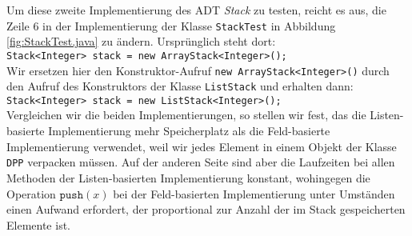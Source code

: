 Um diese zweite Implementierung des ADT \textsl{Stack} zu testen, reicht es aus, die Zeile
6 in der Implementierung der Klasse \texttt{StackTest} in Abbildung \ref{fig:StackTest.java}
 zu \"andern.  Urspr\"unglich steht dort: \\[0.1cm]
\hspace*{1.3cm} \texttt{Stack<Integer> stack = new ArrayStack<Integer>();}
\\[0.2cm]
Wir ersetzen hier den Konstruktor-Aufruf \texttt{new ArrayStack<Integer>()} durch den
Aufruf des Konstruktors der  Klasse \texttt{ListStack} und erhalten dann:
\\[0.2cm]
\hspace*{1.3cm} \texttt{Stack<Integer> stack = new ListStack<Integer>();}
\\[0.2cm]
Vergleichen wir die beiden Implementierungen, so stellen wir fest, das die
Listen-basierte Implementierung mehr Speicherplatz als die Feld-basierte Implementierung
verwendet, weil wir jedes Element in einem Objekt der Klasse \texttt{DPP} verpacken
m\"ussen.  Auf der anderen Seite sind aber die Laufzeiten bei allen Methoden der
Listen-basierten Implementierung konstant, wohingegen die Operation $\mathtt{push}(x)$ bei der
Feld-basierten Implementierung unter Umst\"anden einen Aufwand erfordert, der proportional
zur Anzahl der im Stack gespeicherten Elemente ist.


